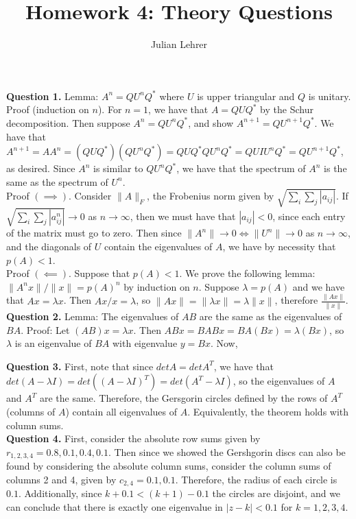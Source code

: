 \documentclass{article}
\title{Homework 4: Theory Questions}
\date{}
\author{Julian Lehrer}
\newcommand{\ra}{\longrightarrow}
\begin{document}
\maketitle
\textbf{Question 1.} Lemma: $A^n = QU^n Q^*$ where $U$ is upper triangular and $Q$ is unitary. Proof (induction on $n$). For $n=1$, we have that $A = QUQ^*$ by the Schur decomposition. Then suppose $A^n = QU^n Q^*$, and show $A^{n+1}=QU^{n+1}Q^*$. We have that $A^{n+1} = AA^{n} = (Q U Q^*)(QU^n Q^*) = QU Q^* Q U^n Q^* = QUIU^n Q^* = QU^{n+1}Q^*$, as desired. Since $A^n$ is similar to $QU^n Q^*$, we have that the spectrum of $A^n$ is the same as the spectrum of $U^n$. \\

Proof $(\implies)$. Consider $\|A \|_F$, the Frobenius norm given by $\sqrt{\sum_{i}\sum_{j}|a_{ij}|}$. If $\sqrt{\sum_{i}\sum_j|a^n_{ij}|} \ra 0$ as $n \ra \infty$, then we must have that $|a_{ij}| < 0$, since each entry of the matrix must go to zero. Then since $\|A^n\| \ra 0 \iff \|U^n\| \ra 0$ as $n \ra \infty$, and the diagonals of $U$ contain the eigenvalues of $A$, we have by necessity that $p(A) < 1$. \\

Proof $(\impliedby)$. Suppose that $p(A) < 1$. We prove the following lemma: $\|A^n x\|/\|x\| = p(A)^n$ by induction on $n$. Suppose $\lambda = p(A)$ and we have that $Ax = \lambda x$. Then $Ax / x = \lambda$, so $\|Ax\| = \|\lambda x\| = \lambda \|x\|$, therefore $\frac{\|Ax\|}{\|x\|}$. \\ 

\textbf{Question 2.} Lemma: The eigenvalues of $AB$ are the same as the eigenvalues of $BA$. Proof: Let $(AB)x = \lambda x$. Then $ABx = BABx = BA(Bx) = \lambda (Bx)$, so $\lambda$ is an eigenvalue of $BA$ with eigenvalue $y=Bx$. Now,

\textbf{Question 3.} First, note that since $det A = det A^T$, we have that $det(A - \lambda I) = det((A-\lambda I)^T) = det(A^T - \lambda I)$, so the eigenvalues of $A$ and $A^T$ are the same. Therefore, the Gersgorin circles defined by the rows of $A^T$ (columns of $A$) contain all eigenvalues of $A$. Equivalently, the theorem holds with column sums.\\

\textbf{Question 4.} First, consider the absolute row sums given by $r_{1,2,3,4} = 0.8, 0.1, 0.4, 0.1$. Then since we showed the Gershgorin discs can also be found by considering the absolute column sums, consider the column sums of columns 2 and 4, given by $c_{2,4} = 0.1, 0.1$. Therefore, the radius of each circle is $0.1$. Additionally, since $k+0.1<(k+1)-0.1$ the circles are disjoint, and we can conclude that there is exactly one eigenvalue in $|z-k| < 0.1$ for $k=1,2,3,4$. \\
\end{document}
